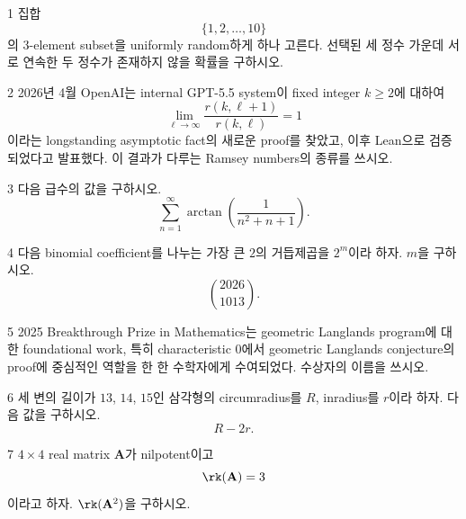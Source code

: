 \documentclass[11pt,oneside]{article}
\begin{document}

\begin{problem}{1}
집합
\[
    \{1,2,\ldots,10\}
\]
의 $3$-element subset을 uniformly random하게 하나 고른다. 선택된 세 정수 가운데 서로 연속한 두 정수가 존재하지 않을 확률을 구하시오.
\end{problem}

\begin{problem}{2}
2026년 4월 OpenAI는 internal GPT-5.5 system이 fixed integer $k\geq2$에 대하여
\[
    \lim_{\ell\to\infty}
    \frac{r(k,\ell+1)}{r(k,\ell)}
    =1
\]
이라는 longstanding asymptotic fact의 새로운 proof를 찾았고, 이후 Lean으로 검증되었다고 발표했다. 이 결과가 다루는 Ramsey numbers의 종류를 쓰시오.
\end{problem}

\begin{problem}{3}
다음 급수의 값을 구하시오.
\[
    \sum_{n=1}^{\infty}
    \arctan\!\left(\frac{1}{n^2+n+1}\right).
\]
\end{problem}

\begin{problem}{4}
다음 binomial coefficient를 나누는 가장 큰 $2$의 거듭제곱을 $2^m$이라 하자. $m$을 구하시오.
\[
    \binom{2026}{1013}.
\]
\end{problem}

\begin{problem}{5}
2025 Breakthrough Prize in Mathematics는 geometric Langlands program에 대한 foundational work, 특히 characteristic $0$에서 geometric Langlands conjecture의 proof에 중심적인 역할을 한 한 수학자에게 수여되었다. 수상자의 이름을 쓰시오.
\end{problem}

\begin{problem}{6}
세 변의 길이가 $13$, $14$, $15$인 삼각형의 circumradius를 $R$, inradius를 $r$이라 하자. 다음 값을 구하시오.
\[
    R-2r.
\]
\end{problem}

\newpage

\begin{problem}{7}
$4\times4$ real matrix $\mathbf{A}$가 nilpotent이고
\[
    \rk(\mathbf{A})=3
\]
이라고 하자. $\rk(\mathbf{A}^2)$을 구하시오.
\end{problem}
\end{document}
